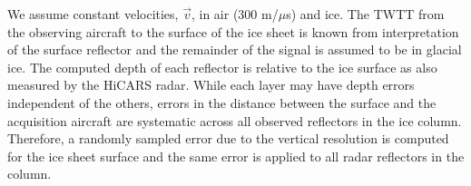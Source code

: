 
We assume constant velocities, $\vec{v}$, in air (300 m/${\mu}$s) and ice. The TWTT from the observing aircraft to the surface of the ice sheet is known from interpretation of the surface reflector and the remainder of the signal is assumed to be in glacial ice. The computed depth of each reflector is relative to the ice surface as also measured by the HiCARS radar. While each layer may have depth errors independent of the others, errors in the distance between the surface and the acquisition aircraft are systematic across all observed reflectors in the ice column. Therefore, a randomly sampled error due to the vertical resolution is computed for the ice sheet surface and the same error is applied to all radar reflectors in the column. 







